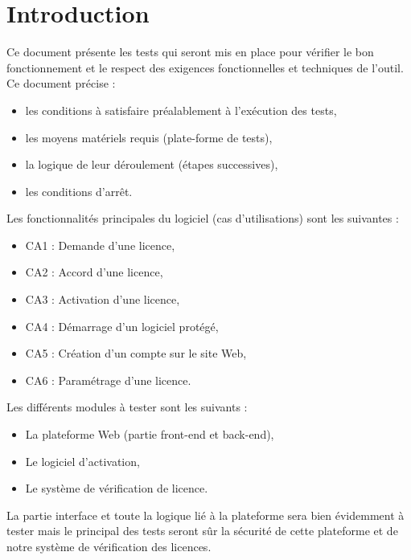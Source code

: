 \chapter{Introduction}
Ce document présente les tests qui seront mis en place pour vérifier le bon fonctionnement et le
respect des exigences fonctionnelles et techniques de l'outil.
Ce document précise :
\begin{itemize}
    \item les conditions à satisfaire préalablement à l’exécution des tests,
    \item les moyens matériels requis (plate-forme de tests),
    \item la logique de leur déroulement (étapes successives),
    \item les conditions d’arrêt.
\end{itemize}
\medskip

Les fonctionnalités principales du logiciel (cas d'utilisations) sont les suivantes :
\begin{itemize}
    \item CA1 : Demande d'une licence,
    \item CA2 : Accord d'une licence,
    \item CA3 : Activation d'une licence,
    \item CA4 : Démarrage d'un logiciel protégé,
    \item CA5 : Création d'un compte sur le site Web,
    \item CA6 : Paramétrage d'une licence.
\end{itemize}
\medskip

Les différents modules à tester sont les suivants :
\begin{itemize}
    \item La plateforme Web (partie front-end et back-end),
    \item Le logiciel d'activation,
    \item Le système de vérification de licence.
\end{itemize}
\medskip

La partie interface et toute la logique lié à la plateforme sera bien évidemment à tester mais le
principal des tests seront sûr la sécurité de cette plateforme et de notre système de vérification
des licences.


